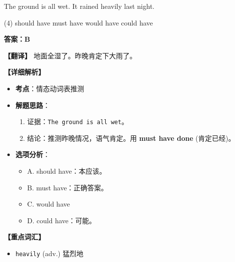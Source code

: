 \documentclass[11pt, a4paper]{article}
\newcommand{\analysis}[4]{
    \begin{solutionbox}
        \textbf{答案：#1}
        
        \textbf{【翻译】} #2
        
        \textbf{【详细解析】}
        #3
        
        \textbf{【重点词汇】}
        #4
    \end{solutionbox}
}
\newcommand{\blank}{\underline{\hspace{1.5cm}}}
\begin{document}
\begin{questions}
    \item The ground is all wet. It \blank rained heavily last night.
    \begin{tasks}(4)
        \task should have \task must have \task would have \task could have
    \end{tasks}
    \analysis{B}{地面全湿了。昨晚肯定下大雨了。}{
        \begin{itemize}
            \item \textbf{考点}：情态动词表推测
            \item \textbf{解题思路}：
                \begin{enumerate}
                    \item 证据：\texttt{The ground is all wet}。
                    \item 结论：推测昨晚情况，语气肯定。用 \textbf{must have done} (肯定已经)。
                \end{enumerate}
            \item \textbf{选项分析}：
                \begin{itemize}
                    \item A. should have：本应该。
                    \item B. must have：正确答案。
                    \item C. would have
                    \item D. could have：可能。
                \end{itemize}
        \end{itemize}
    }{
        \begin{itemize}
            \item \texttt{heavily} (adv.) 猛烈地
        \end{itemize}
    }


\end{questions}
\end{document}
